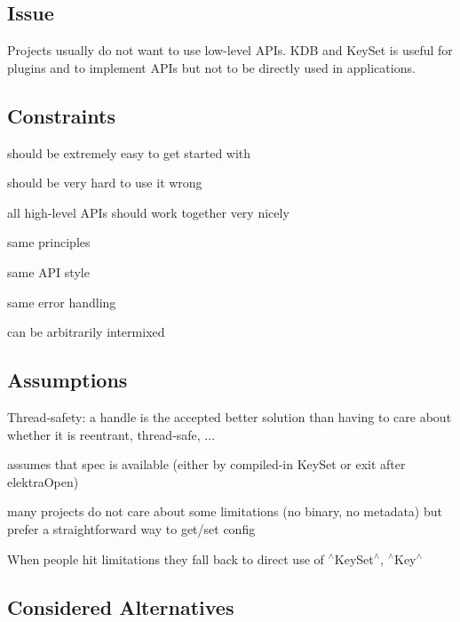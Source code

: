 \subsection*{Issue}

Projects usually do not want to use low-\/level A\+P\+Is. {\ttfamily K\+DB} and {\ttfamily Key\+Set} is useful for plugins and to implement A\+P\+Is but not to be directly used in applications.

\subsection*{Constraints}


\begin{DoxyEnumerate}
\item should be extremely easy to get started with
\item should be very hard to use it wrong
\item all high-\/level A\+P\+Is should work together very nicely
\begin{DoxyItemize}
\item same principles
\item same A\+PI style
\item same error handling
\item can be arbitrarily intermixed
\end{DoxyItemize}
\end{DoxyEnumerate}

\subsection*{Assumptions}


\begin{DoxyItemize}
\item Thread-\/safety\+: a handle is the accepted better solution than having to care about whether it is reentrant, thread-\/safe, ...
\item assumes that spec is available (either by compiled-\/in {\ttfamily Key\+Set} or exit after elektra\+Open)
\item many projects do not care about some limitations (no binary, no metadata) but prefer a straightforward way to get/set config
\item When people hit limitations they fall back to direct use of $^\wedge$\+Key\+Set$^\wedge$, $^\wedge$\+Key$^\wedge$
\end{DoxyItemize}

\subsection*{Considered Alternatives}


